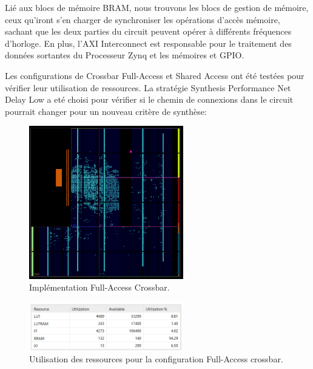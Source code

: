 \documentclass[../CSC_5RO07_TA.tex]{subfiles}
\begin{document}
Lié aux blocs de mémoire BRAM, nous trouvons les blocs de gestion de mémoire, ceux qu'iront s'en charger de synchroniser les opérations d'accès mémoire, sachant que les deux parties du circuit peuvent opérer à différents fréquences d'horloge. En plus, l'AXI Interconnect est responsable pour le traitement des données sortantes du Processeur Zynq et les mémoires et GPIO.

Les configurations de Crossbar Full-Access et Shared Access ont été testées pour vérifier leur utilisation de ressources. La stratégie Synthesis Performance Net Delay Low a eté choisi pour vérifier si le chemin de connexions dans le circuit pourrait changer pour un nouveau critère de synthèse: 

\begin{figure}[H]
    \centering
    \includegraphics[width=0.6\textwidth]{./images/perfNetDelLow_full_imp.png}
    \caption{Implémentation Full-Access Crossbar.}
\end{figure}

\begin{figure}[H]
    \centering
    \includegraphics[width=0.6\textwidth]{./images/perfNetDelLow_full_uti.png}
    \caption{Utilisation des ressources pour la configuration Full-Access crossbar.}
\end{figure}
\end{document}
